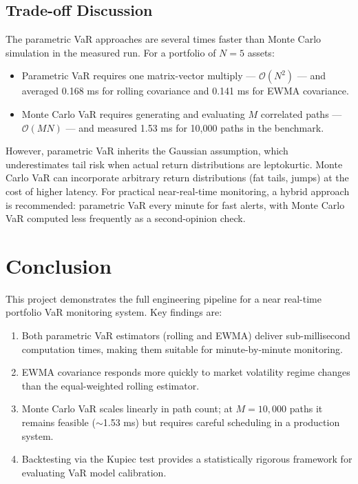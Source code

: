 \documentclass[12pt, a4paper]{article}
\begin{document}
\subsection{Trade-off Discussion}

The parametric VaR approaches are several times faster than Monte Carlo
simulation in the measured run.  For a portfolio of $N = 5$ assets:
\begin{itemize}
  \item Parametric VaR requires one matrix-vector multiply —
        $\mathcal{O}(N^2)$ — and averaged 0.168 ms for rolling covariance
        and 0.141 ms for EWMA covariance.
  \item Monte Carlo VaR requires generating and evaluating $M$ correlated
        paths — $\mathcal{O}(MN)$ — and measured 1.53 ms for 10,000 paths
        in the benchmark.
\end{itemize}

However, parametric VaR inherits the Gaussian assumption, which
underestimates tail risk when actual return distributions are leptokurtic.
Monte Carlo VaR can incorporate arbitrary return distributions (fat tails,
jumps) at the cost of higher latency.  For practical near-real-time
monitoring, a hybrid approach is recommended: parametric VaR every minute
for fast alerts, with Monte Carlo VaR computed less frequently as a
second-opinion check.

\section{Conclusion}
\label{sec:conclusion}

This project demonstrates the full engineering pipeline for a near
real-time portfolio VaR monitoring system.  Key findings are:
\begin{enumerate}
  \item Both parametric VaR estimators (rolling and EWMA) deliver
        sub-millisecond computation times, making them suitable for
        minute-by-minute monitoring.
  \item EWMA covariance responds more quickly to market volatility
        regime changes than the equal-weighted rolling estimator.
  \item Monte Carlo VaR scales linearly in path count; at $M = 10{,}000$
        paths it remains feasible ($\sim$1.53 ms) but requires careful
        scheduling in a production system.
  \item Backtesting via the Kupiec test provides a statistically rigorous
        framework for evaluating VaR model calibration.
\end{enumerate}
\end{document}
